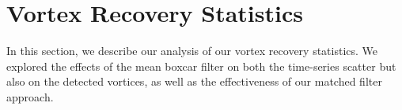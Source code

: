 \documentclass{aastex63}
\begin{document}
\acknowledgments

%

\vspace{5mm}
\facilities{}


\software{}



\appendix

\section{Vortex Recovery Statistics}
\label{sec:Vortex Recovery Statistics}
In this section, we describe our analysis of our vortex recovery statistics. We explored the effects of the mean boxcar filter on both the time-series scatter but also on the detected vortices, as well as the effectiveness of our matched filter approach.
\end{document}
